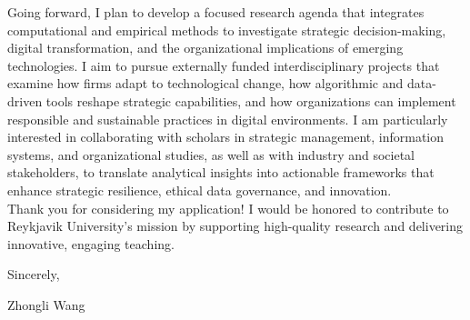 \documentclass{nfr}
\begin{document}
Going forward, I plan to develop a focused research agenda that integrates computational and empirical methods to investigate strategic decision-making, digital transformation, and the organizational implications of emerging technologies. 
I aim to pursue externally funded interdisciplinary projects that examine how firms adapt to technological change, how algorithmic and data-driven tools reshape strategic capabilities, and how organizations can implement responsible and sustainable practices in digital environments. 
I am particularly interested in collaborating with scholars in strategic management, information systems, and organizational studies, as well as with industry and societal stakeholders, to translate analytical insights into actionable frameworks that enhance strategic resilience, ethical data governance, and innovation.\\

Thank you for considering my application! 
I would be honored to contribute to Reykjavik University’s mission by supporting high-quality research and delivering innovative, engaging teaching.\\
\vspace{5mm}

\noindent Sincerely,\\
\vspace{5mm}

\noindent Zhongli Wang

\vspace{5mm}



\end{document}
